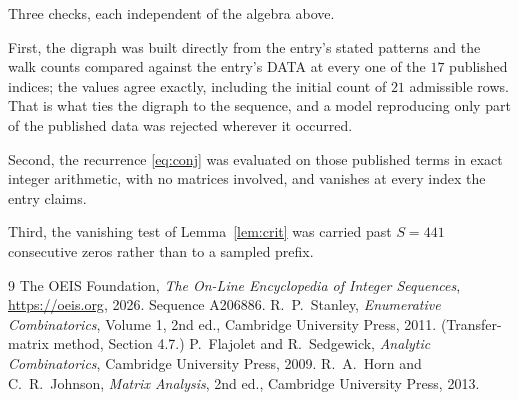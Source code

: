 \documentclass[11pt,a4paper]{article}
\theoremstyle{plain}
\theoremstyle{definition}
\begin{document}
Three checks, each independent of the algebra above.

First, the digraph was built directly from the entry's stated patterns and the walk counts
compared against the entry's DATA at every one of the $17$ published indices; the
values agree exactly, including the initial count of $21$ admissible rows. That is
what ties the digraph to the sequence, and a model reproducing only part of the published
data was rejected wherever it occurred.

Second, the recurrence \eqref{eq:conj} was evaluated on those published terms in exact
integer arithmetic, with no matrices involved, and vanishes at every index the entry claims.

Third, the vanishing test of Lemma~\ref{lem:crit} was carried past $S=441$ consecutive
zeros rather than to a sampled prefix.

\begin{thebibliography}{9}
 The OEIS Foundation, \emph{The On-Line Encyclopedia of Integer
Sequences}, \url{https://oeis.org}, 2026. Sequence A206886.
 R.~P.~Stanley, \emph{Enumerative Combinatorics}, Volume 1, 2nd ed.,
Cambridge University Press, 2011. (Transfer-matrix method, Section 4.7.)
 P.~Flajolet and R.~Sedgewick, \emph{Analytic Combinatorics}, Cambridge
University Press, 2009.
 R.~A.~Horn and C.~R.~Johnson, \emph{Matrix Analysis}, 2nd ed., Cambridge
University Press, 2013.
\end{thebibliography}
\end{document}
